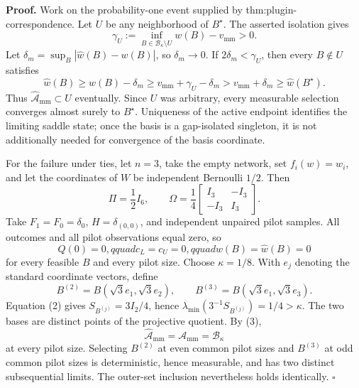 \textbf{Proof.}
Work on the probability-one event supplied by thm:plugin-correspondence. Let \(U\) be any neighborhood of \(B^\star\). The asserted isolation gives
\[
\gamma_U:=\inf_{B\in\mathcal B_\kappa\setminus U}w(B)-v_{\mathrm{mm}}>0. \tag{1}
\]
Let \(\delta_m=\sup_B|\widehat w(B)-w(B)|\), so \(\delta_m\to0\). If \(2\delta_m<\gamma_U\), then every \(B\notin U\) satisfies
\[
\widehat w(B)\ge w(B)-\delta_m
\ge v_{\mathrm{mm}}+\gamma_U-\delta_m
>v_{\mathrm{mm}}+\delta_m
\ge\widehat w(B^\star).
\]
Thus \(\widehat{\mathcal A}_{\mathrm{mm}}\subset U\) eventually. Since \(U\) was arbitrary, every measurable selection converges almost surely to \(B^\star\). Uniqueness of the active endpoint identifies the limiting saddle state; once the basis is a gap-isolated singleton, it is not additionally needed for convergence of the basis coordinate.

For the failure under ties, let \(n=3\), take the empty network, set \(f_i(w)=w_i\), and let the coordinates of \(W\) be independent Bernoulli \(1/2\). Then
\[
\Pi=\frac12I_6,
\qquad
\Omega=\frac14\begin{bmatrix}I_3&-I_3\\-I_3&I_3\end{bmatrix}. \tag{2}
\]
Take \(F_1=F_0=\delta_0\), \(H=\delta_{(0,0)}\), and independent unpaired pilot samples. All outcomes and all pilot observations equal zero, so
\[
Q(0)=0,qquad c_L=c_U=0,qquad w(B)=\widehat w(B)=0 \tag{3}
\]
for every feasible \(B\) and every pilot size. Choose \(\kappa=1/8\). With \(e_j\) denoting the standard coordinate vectors, define
\[
B^{(2)}=B(\sqrt3e_1,\sqrt3e_2),
\qquad
B^{(3)}=B(\sqrt3e_1,\sqrt3e_3).
\]
Equation (2) gives \(S_{B^{(j)}}=3I_2/4\), hence \(\lambda_{\min}(3^{-1}S_{B^{(j)}})=1/4>\kappa\). The two bases are distinct points of the projective quotient. By (3),
\[
\widehat{\mathcal A}_{\mathrm{mm}}=\mathcal A_{\mathrm{mm}}=\mathcal B_\kappa
\]
at every pilot size. Selecting \(B^{(2)}\) at even common pilot sizes and \(B^{(3)}\) at odd common pilot sizes is deterministic, hence measurable, and has two distinct subsequential limits. The outer-set inclusion nevertheless holds identically. \(\square\)